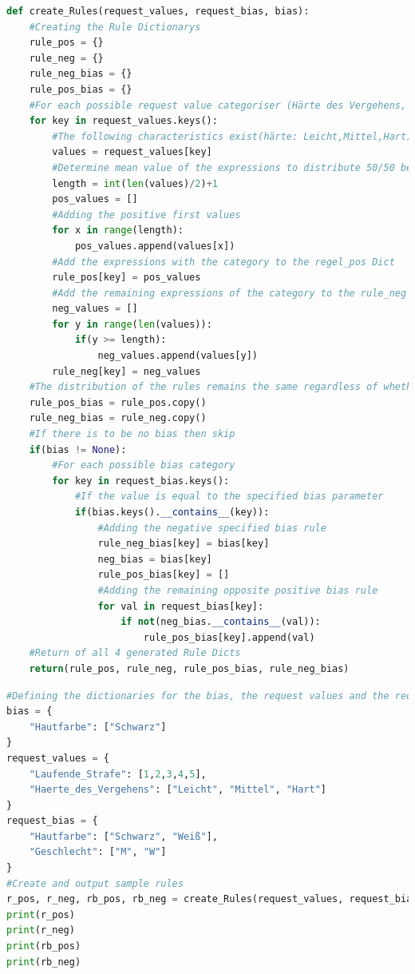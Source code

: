 \documentclass[a4paper,12pt]{report}
\begin{document}
\begin{lstlisting}[language=Python,label={lst:Sz1Z3},caption=Dritte Zelle Funktion für das erstellen der Regeln]
def create_Rules(request_values, request_bias, bias):
    #Creating the Rule Dictionarys
    rule_pos = {}
    rule_neg = {}
    rule_neg_bias = {}
    rule_pos_bias = {}
    #For each possible request value categoriser (Härte des Vergehens, Laufende Strafe)
    for key in request_values.keys():
        #The following characteristics exist(härte: Leicht,Mittel,Hart)
        values = request_values[key]
        #Determine mean value of the expressions to distribute 50/50 between positive and negative rules
        length = int(len(values)/2)+1
        pos_values = []
        #Adding the positive first values
        for x in range(length):
            pos_values.append(values[x])
        #Add the expressions with the category to the regel_pos Dict
        rule_pos[key] = pos_values
        #Add the remaining expressions of the category to the rule_neg
        neg_values = []
        for y in range(len(values)):
            if(y >= length):
                neg_values.append(values[y])
        rule_neg[key] = neg_values
    #The distribution of the rules remains the same regardless of whether bias or not, so copy deep for now.
    rule_pos_bias = rule_pos.copy()
    rule_neg_bias = rule_neg.copy()
    #If there is to be no bias then skip
    if(bias != None):
        #For each possible bias category
        for key in request_bias.keys():
            #If the value is equal to the specified bias parameter
            if(bias.keys().__contains__(key)):
                #Adding the negative specified bias rule
                rule_neg_bias[key] = bias[key]
                neg_bias = bias[key]
                rule_pos_bias[key] = []
                #Adding the remaining opposite positive bias rule
                for val in request_bias[key]:
                    if not(neg_bias.__contains__(val)):
                        rule_pos_bias[key].append(val)
    #Return of all 4 generated Rule Dicts
    return(rule_pos, rule_neg, rule_pos_bias, rule_neg_bias)
\end{lstlisting}
\begin{lstlisting}[language=Python,label={lst:Sz1Z4},caption=Vierte Zelle Testzelle zur Überprüfung der erzeugten Regeln]
#Defining the dictionaries for the bias, the request values and the request bias values
bias = {
    "Hautfarbe": ["Schwarz"]
}
request_values = {
    "Laufende_Strafe": [1,2,3,4,5],
    "Haerte_des_Vergehens": ["Leicht", "Mittel", "Hart"]
}
request_bias = {
    "Hautfarbe": ["Schwarz", "Weiß"],
    "Geschlecht": ["M", "W"]
}
#Create and output sample rules
r_pos, r_neg, rb_pos, rb_neg = create_Rules(request_values, request_bias, bias)
print(r_pos)
print(r_neg)
print(rb_pos)
print(rb_neg)
\end{lstlisting}
\end{document}
